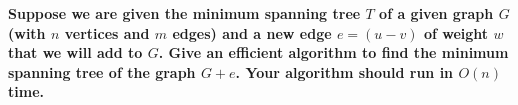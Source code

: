 \textbf{Suppose we are given the minimum spanning tree $T$ of a given graph $G$ (with $n$ vertices and $m$ edges) and a new edge $e = (u - v)$ of weight $w$ that we will add to $G$. Give an efficient algorithm to find the minimum spanning tree of the graph $G + e$. Your algorithm should run in $O(n)$ time.}\vspace{.2cm}

\textcolor{bibi}{}
\begin{quote}
\end{quote}